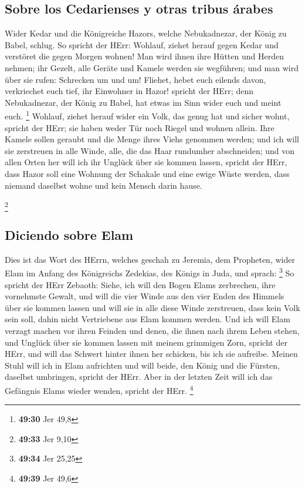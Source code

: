 \hypertarget{sobre-los-cedarienses-y-otras-tribus-uxe1rabes}{%
\subsection{Sobre los Cedarienses y otras tribus
árabes}\label{sobre-los-cedarienses-y-otras-tribus-uxe1rabes}}

 Wider Kedar und die Königreiche Hazors, welche
Nebukadnezar, der König zu Babel, schlug. So spricht der HErr: Wohlauf,
ziehet herauf gegen Kedar und verstöret die gegen Morgen wohnen!
 Man wird ihnen ihre Hütten und Herden nehmen; ihr
Gezelt, alle Geräte und Kamele werden sie wegführen; und man wird über
sie rufen: Schrecken um und um!  Fliehet, hebet euch
eilends davon, verkriechet euch tief, ihr Einwohner in Hazor! spricht
der HErr; denn Nebukadnezar, der König zu Babel, hat etwas im Sinn wider
euch und meint euch. \footnote{\textbf{49:30} Jer 49,8} 
Wohlauf, ziehet herauf wider ein Volk, das genug hat und sicher wohnt,
spricht der HErr; sie haben weder Tür noch Riegel und wohnen allein.
 Ihre Kamele sollen geraubt und die Menge ihres Viehs
genommen werden; und ich will sie zerstreuen in alle Winde, alle, die
das Haar rundumher abschneiden; und von allen Orten her will ich ihr
Unglück über sie kommen lassen, spricht der HErr,  dass
Hazor soll eine Wohnung der Schakale und eine ewige Wüste werden, dass
niemand daselbst wohne und kein Mensch darin hause.

\footnote{\textbf{49:33} Jer 9,10}

\hypertarget{diciendo-sobre-elam}{%
\subsection{Diciendo sobre Elam}\label{diciendo-sobre-elam}}

 Dies ist das Wort des HErrn, welches geschah zu Jeremia,
dem Propheten, wider Elam im Anfang des Königreichs Zedekias, des Königs
in Juda, und sprach: \footnote{\textbf{49:34} Jer 25,25} 
So spricht der HErr Zebaoth: Siehe, ich will den Bogen Elams zerbrechen,
ihre vornehmste Gewalt,  und will die vier Winde aus den
vier Enden des Himmels über sie kommen lassen und will sie in alle diese
Winde zerstreuen, dass kein Volk sein soll, dahin nicht Vertriebene aus
Elam kommen werden.  Und ich will Elam verzagt machen vor
ihren Feinden und denen, die ihnen nach ihrem Leben stehen, und Unglück
über sie kommen lassen mit meinem grimmigen Zorn, spricht der HErr, und
will das Schwert hinter ihnen her schicken, bis ich sie aufreibe.
 Meinen Stuhl will ich in Elam aufrichten und will beide,
den König und die Fürsten, daselbst umbringen, spricht der HErr.
 Aber in der letzten Zeit will ich das Gefängnis Elams
wieder wenden, spricht der HErr. \footnote{\textbf{49:39} Jer 49,6}


